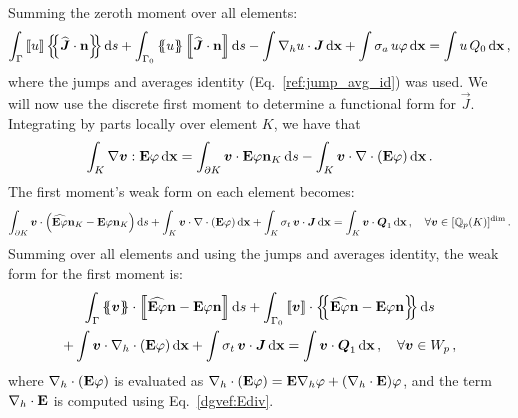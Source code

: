 \documentclass[../doc.tex]{subfiles}
\begin{document}
Summing the zeroth moment over all elements: 
	\begin{equation}
		\int_\Gamma \jump{u} \avg{\widehat{\vec{J}}\cdot\n} \ud s + \int_{\Gamma_0} \avg{u}\jump{\widehat{\vec{J}}\cdot\n} \ud s - \int \nablah u \cdot \vec{J} \ud \x + \int \sigma_a \, u\varphi \ud \x = \int u\, Q_0 \ud \x \,,
	\end{equation}
where the jumps and averages identity (Eq.~\ref{ref:jump_avg_id}) was used. We will now use the discrete first moment to determine a functional form for $\vec{J}$. Integrating by parts locally over element $K$, we have that 
	\begin{equation} \label{dgvef:identity}
		\int_K \nabla\boldsymbol{v} : \boldsymbol{\mathrm{E}} \varphi \mathop{}\!\mathrm{d} \boldsymbol{\mathrm{x}} = \int_{\partial K} \boldsymbol{v}\cdot\boldsymbol{\mathrm{E}}\varphi\boldsymbol{\mathrm{n}}_K \mathop{}\!\mathrm{d} s - \int_K \boldsymbol{v}\cdot\nabla\cdot\left( \boldsymbol{\mathrm{E}}\varphi \right) \mathop{}\!\mathrm{d} \boldsymbol{\mathrm{x}} \,. 
	\end{equation}
The first moment's weak form on each element becomes: 
	\begin{equation}
		\int_{\partial K} \boldsymbol{v}\cdot\left( \widehat{\boldsymbol{\mathrm{E}}\varphi}\boldsymbol{\mathrm{n}}_K - \boldsymbol{\mathrm{E}}\varphi\boldsymbol{\mathrm{n}}_K \right) \mathop{}\!\mathrm{d} s + \int_K \boldsymbol{v}\cdot\nabla\cdot\left( \boldsymbol{\mathrm{E}}\varphi \right) \mathop{}\!\mathrm{d} \boldsymbol{\mathrm{x}} + \int_K \sigma_t \, \boldsymbol{v}\cdot\boldsymbol{J} \mathop{}\!\mathrm{d} \boldsymbol{\mathrm{x}} = \int_K \boldsymbol{v} \cdot\boldsymbol{Q}_1 \mathop{}\!\mathrm{d} \boldsymbol{\mathrm{x}} \,, \quad \forall \boldsymbol{v} \in [\mathbb{Q}_p(K)]^{\dim} \,. 
	\end{equation}
Summing over all elements and using the jumps and averages identity, the weak form for the first moment is:  
	\begin{multline} \label{dgvef:weak_strong}
		\int_\Gamma \avg{\vec{v}}\cdot\jump{\widehat{\E\varphi}\n - \E\varphi\n} \ud s + \int_{\Gamma_0} \jump{\vec{v}} \cdot \avg{\widehat{\E\varphi}\n - \E\varphi\n} \ud s \\+ \int \vec{v}\cdot\nablah \cdot\paren{\E\varphi} \ud \x + \int \sigma_t \, \vec{v}\cdot\vec{J} \ud \x = \int \vec{v}\cdot\vec{Q}_1 \ud \x \,, \quad \forall \vec{v} \in W_p \,, 
	\end{multline}
where $\nabla_h\cdot\left( \boldsymbol{\mathrm{E}}\varphi \right)$ is evaluated as $\nabla_h\cdot\left( \boldsymbol{\mathrm{E}}\varphi \right) = \boldsymbol{\mathrm{E}}\nabla_h \varphi + \left( \nabla_h\cdot\boldsymbol{\mathrm{E}} \right)\!\varphi$, and the term $\nabla_h\cdot\boldsymbol{\mathrm{E}}$ is computed using Eq.~\ref{dgvef:Ediv}. 
\end{document}
